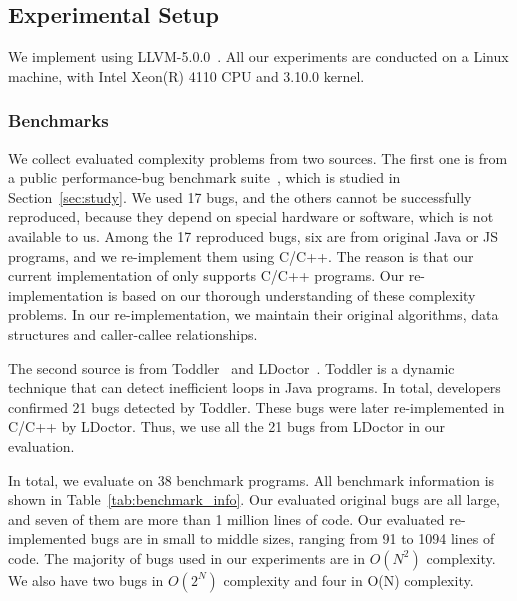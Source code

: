 \subsection{Experimental Setup}

We implement \Tool using LLVM-5.0.0~\cite{llvm}. 
All our experiments are conducted on a Linux machine, 
with Intel Xeon(R) 4110 CPU and 3.10.0 kernel.





\subsubsection{Benchmarks}

We collect evaluated complexity problems from two sources. 
The first one is
from a public performance-bug benchmark 
suite~\cite{PerfBug,SongOOPSLA2014,ldoctor}, which is
studied in Section~\ref{sec:study}.
We used 17 bugs, and the others cannot be successfully
reproduced, because they depend on special hardware 
or software, which is not available to us. 
Among the 17 reproduced bugs, six are from
original Java or JS programs, 
and we re-implement them using C/C++.
The reason is that our current implementation of \Tool 
only supports C/C++ programs.
Our re-implementation is based on our thorough 
understanding of these complexity problems.
In our re-implementation, we maintain 
their original algorithms, 
data structures and caller-callee relationships. 


The second source is from Toddler~\cite{Alabama} and LDoctor~\cite{ldoctor}. 
Toddler is a dynamic technique that can detect inefficient loops in Java programs.
In total, developers confirmed 21 bugs detected by Toddler. 
These bugs were later re-implemented in C/C++ by LDoctor. 
Thus, we use all the 21 bugs from LDoctor in our evaluation.  


In total, we evaluate \Tool on 38 benchmark programs. 
All benchmark information is shown in Table~\ref{tab:benchmark_info}. 
Our evaluated original bugs are all large, and seven of them 
are more than 1 million lines of code.
Our evaluated re-implemented bugs are in small to middle sizes, 
ranging from 91 to 1094 lines of code. 
The majority of bugs used in our experiments are in $O(N^2)$ complexity. 
We also have two bugs in $O(2^N)$ complexity 
and four in O(N) complexity.


